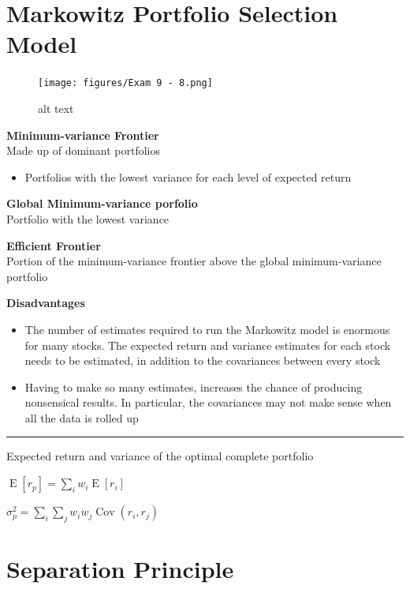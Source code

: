 \documentclass[]{book}
\providecommand{\tightlist}{%
  \setlength{\itemsep}{0pt}\setlength{\parskip}{0pt}}
\theoremstyle{definition}
\theoremstyle{definition}
\theoremstyle{remark}
\begin{document}
\section{Markowitz Portfolio Selection
Model}\label{markowitz-portfolio-selection-model}

\begin{figure}[htbp]
\centering
\texttt{[image: figures/Exam 9 - 8.png]}
\caption{alt text}
\end{figure}

\textbf{Minimum-variance Frontier}\\
Made up of dominant portfolios

\begin{itemize}
\tightlist
\item
  Portfolios with the lowest variance for each level of expected return
\end{itemize}

\textbf{Global Minimum-variance porfolio}\\
Portfolio with the lowest variance

\textbf{Efficient Frontier}\\
Portion of the minimum-variance frontier above the global
minimum-variance portfolio

\textbf{Disadvantages}

\begin{itemize}
\item
  The number of estimates required to run the Markowitz model is
  enormous for many stocks. The expected return and variance estimates
  for each stock needs to be estimated, in addition to the covariances
  between every stock
\item
  Having to make so many estimates, increases the chance of producing
  nonsensical results. In particular, the covariances may not make sense
  when all the data is rolled up
\end{itemize}

\begin{center}\rule{0.5\linewidth}{\linethickness}\end{center}

Expected return and variance of the optimal complete portfolio

\(\operatorname{E}[r_p] = \sum_i w_i \operatorname{E}[r_i]\)

\(\sigma^2_p = \sum_i \sum_j w_i w_j \operatorname{Cov}(r_i, r_j)\)

\section{Separation Principle}\label{separation-principle}
\end{document}
